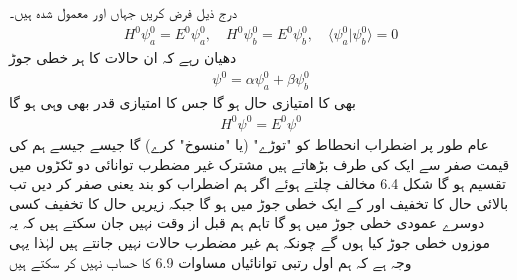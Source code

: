 درج ذیل فرض کریں جہاں  اور  معمول شدہ ہیں۔
\begin{align}
H^0 \psi_a^0 = E^0 \psi_a^0, \quad H^0 \psi_b^0 = E^0 \psi_b^0, \quad \langle \psi_a^0 | \psi_b^0 \rangle = 0
\end{align}
دھیان رہے کہ ان حالات کا ہر خطی جوڑ 
\begin{align}
\psi^0 = \alpha \psi_a^0 + \beta \psi_b^0
\end{align}
بھی  کا امتیازی حال ہو گا جس کا  امتیازی قدر  بھی وہی ہو گا 
\begin{align}
H^0 \psi^0 = E^0 \psi^0
\end{align}
عام طور پر اضطراب  انحطاط کو "توڑے"  (یا "منسوخ" کرے) گا جیسے جیسے ہم  کی قیمت صفر سے ایک کی طرف بڑھاتے ہیں مشترک غیر مضطرب توانائی  دو ٹکڑوں میں تقسیم ہو گا شکل 6.4 مخالف چلتے ہوئے اگر ہم اضطراب کو بند  یعنی صفر  کر دیں تب بالائی حال کا تخفیف   اور  کے ایک خطی جوڑ میں ہو گا جبکہ زیریں حال کا تخفیف کسی دوسرے عمودی خطی جوڑ میں ہو گا تاہم ہم قبل از وقت نہیں جان سکتے ہیں کہ یہ موزوں خطی جوڑ کیا ہوں گے چونکہ ہم غیر مضطرب حالات نہیں جانتے ہیں لہٰذا  یہی وجہ ہے کہ ہم اول رتبی توانائیاں مساوات 6.9 کا حساب نہیں کر سکتے ہیں 

